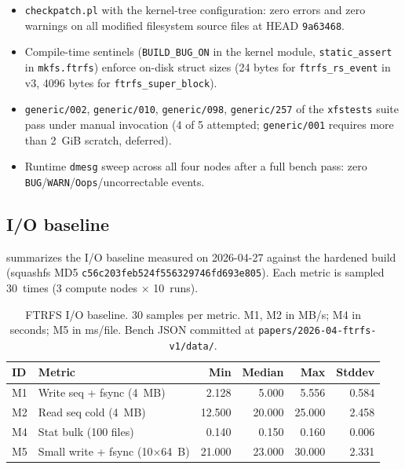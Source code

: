 \begin{itemize}
\item \texttt{checkpatch.pl} with the kernel-tree configuration:
  zero errors and zero warnings on all modified filesystem source
  files at HEAD \texttt{9a63468}.
\item Compile-time sentinels (\texttt{BUILD\_BUG\_ON} in the
  kernel module, \texttt{static\_assert} in \texttt{mkfs.ftrfs})
  enforce on-disk struct sizes (24 bytes for
  \texttt{ftrfs\_rs\_event} in v3, 4096 bytes for
  \texttt{ftrfs\_super\_block}).
\item \texttt{generic/002}, \texttt{generic/010},
  \texttt{generic/098}, \texttt{generic/257} of the
  \texttt{xfstests} suite pass under manual invocation (4 of 5
  attempted; \texttt{generic/001} requires more than 2~GiB
  scratch, deferred).
\item Runtime \texttt{dmesg} sweep across all four nodes after a
  full bench pass: zero
  \texttt{BUG}/\texttt{WARN}/\texttt{Oops}/uncorrectable events.
\end{itemize}

\subsection{I/O baseline}

 summarizes the I/O baseline measured on
2026-04-27 against the hardened build (squashfs MD5
\texttt{c56c203feb524f556329746fd693e805}). Each metric is sampled
30~times (3 compute nodes $\times$ 10~runs).

\begin{table}[!t]
\centering
\small
\caption{FTRFS I/O baseline. 30 samples per metric. M1, M2 in
MB/s; M4 in seconds; M5 in ms/file. Bench JSON committed at
\texttt{papers/2026-04-ftrfs-v1/data/}.}
\label{tab:iobench}
\begin{tabular}{l l r r r r}
\toprule
\textbf{ID} & \textbf{Metric} &
\textbf{Min} & \textbf{Median} & \textbf{Max} & \textbf{Stddev} \\
\midrule
M1 & Write seq + fsync (4~MB)             & 2.128  & 5.000  & 5.556  & 0.584  \\
M2 & Read seq cold (4~MB)                 & 12.500 & 20.000 & 25.000 & 2.458  \\
M4 & Stat bulk (100 files)                & 0.140  & 0.150  & 0.160  & 0.006  \\
M5 & Small write + fsync (10$\times$64~B) & 21.000 & 23.000 & 30.000 & 2.331  \\
\bottomrule
\end{tabular}
\end{table}

